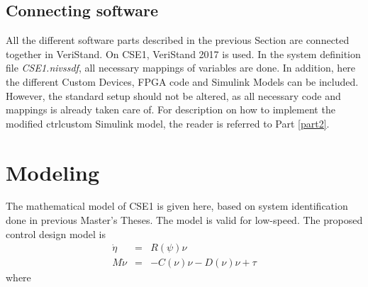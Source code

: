 \section{Connecting software}
All the different software parts described in the previous Section are connected together in VeriStand. On CSE1, VeriStand 2017 is used. In the system definition file \textit{CSE1.nivssdf}, all necessary mappings of variables are done. In addition, here the different Custom Devices, FPGA code and Simulink Models can be included. However, the standard setup should not be altered, as all necessary code and mappings is already taken care of. For description on how to implement the modified ctrl\textunderscore custom Simulink model, the reader is referred to Part \ref{part2}. 
\chapter{Modeling}
The mathematical model of CSE1 is given here, based on system identification done in previous Master's Theses. The model is valid for low-speed. The proposed control design model is
\begin{eqnarray}
\dot{\eta} & = & R\left(\psi\right)\nu\label{eq: CSE1 kinematics}\\
M\dot{\nu} & = & -C\left(\nu\right)\nu-D\left(\nu\right)\nu+\tau\label{eq: CSE1 kinetics}
\end{eqnarray}
where
